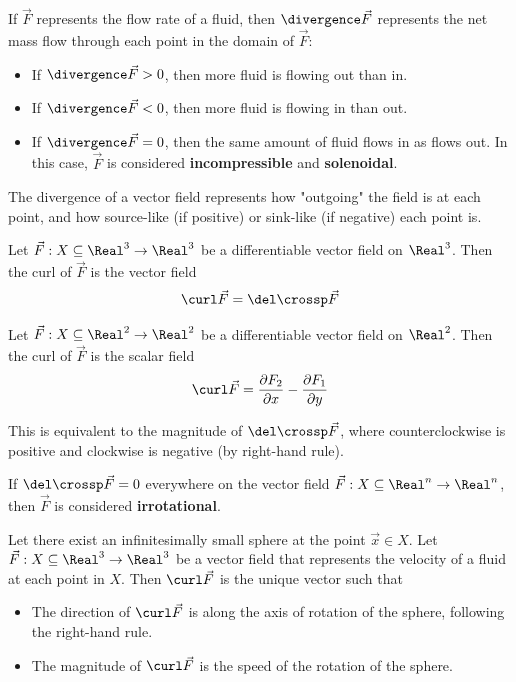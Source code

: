 \begin{lemma}
  If $\vec{F}$ represents the flow rate of a fluid, then $\divergence \vec{F}$ represents the net mass flow through each point in the domain of $\vec{F}$:
  \begin{itemize}
    \item If $\divergence \vec{F} > 0$, then more fluid is flowing out than in.
    \item If $\divergence \vec{F} < 0$, then more fluid is flowing in than out.
    \item If $\divergence \vec{F} = 0$, then the same amount of fluid flows in as flows out. In this case, $\vec{F}$ is considered \textbf{incompressible} and \textbf{solenoidal}.
  \end{itemize}

  The divergence of a vector field represents how "outgoing" the field is at each point, and how source-like (if positive) or sink-like (if negative) each point is.
\end{lemma}

\begin{definition}
  Let $\vec{F} : X \subseteq \Real^3 \to \Real^3$ be a differentiable vector field on $\Real^3$. Then the curl of $\vec{F}$ is the vector field
  \[
    \curl \vec{F} = \del \crossp \vec{F}
  \]
\end{definition}

\begin{definition}
  Let $\vec{F} : X \subseteq \Real^2 \to \Real^2$ be a differentiable vector field on $\Real^2$. Then the curl of $\vec{F}$ is the scalar field
  \[
    \curl \vec{F} = \frac{\partial F_2}{\partial x} - \frac{\partial F_1}{\partial y}
  \]

  This is equivalent to the magnitude of $\del \crossp \vec{F}$, where counterclockwise is positive and clockwise is negative (by right-hand rule).
\end{definition}

\begin{definition}[Irrotational]
  If $\del \crossp \vec{F} = 0$ everywhere on the vector field $\vec{F} : X \subseteq \Real^n \to \Real^n$, then $\vec{F}$ is considered \textbf{irrotational}.
\end{definition}

\begin{lemma}
  Let there exist an infinitesimally small sphere at the point $\vec{x} \in X$. Let $\vec{F} : X \subseteq \Real^3 \to \Real^3$ be a vector field that represents the velocity of a fluid at each point in $X$. Then $\curl \vec{F}$ is the unique vector such that
  \begin{itemize}
    \item The direction of $\curl \vec{F}$ is along the axis of rotation of the sphere, following the right-hand rule.
    \item The magnitude of $\curl \vec{F}$ is the speed of the rotation of the sphere.
  \end{itemize}
\end{lemma}

